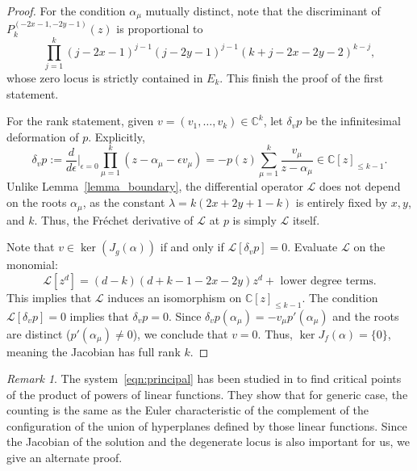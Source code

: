 \documentclass[11pt]{amsart}
\theoremstyle{remark}
\newtheorem{remark}[theorem]{Remark}
\numberwithin{equation}{section}
\begin{document}
\begin{proof}
For the condition $\alpha_\mu$ mutually distinct, note that the discriminant of $P_k^{(-2x-1, -2y-1)}(z)$ is proportional to
\[
    \prod_{j=1}^k (j-2x-1)^{j-1} (j-2y-1)^{j-1} (k+j-2x-2y-2)^{k-j},
\]
whose zero locus is strictly contained in $E_k$. This finish the proof of the first statement.

For the rank statement, given $v = (v_1,\dots,v_k) \in \mathbb{C}^k$, let $\delta_v p$ be the infinitesimal deformation of $p$. Explicitly,
\[
    \delta_v p := \frac{d}{d\epsilon} \Big|_{\epsilon =0} \prod_{\mu=1}^k (z-\alpha_\mu - \epsilon v_\mu) = - p(z) \sum_{\mu=1}^k \frac{v_\mu}{z-\alpha_\mu} \in \mathbb{C}[z]_{\leq k-1}.
\]
Unlike Lemma~\ref{lemma_boundary}, the differential operator $\mathcal{L}$ does not depend on the roots $\alpha_\mu$, as the constant $\lambda = k(2x+2y+1-k)$ is entirely fixed by $x,y$, and $k$. Thus, the Fr\'echet derivative of $\mathcal{L}$ at $p$ is simply $\mathcal{L}$ itself. 

Note that $v \in \ker (J_g(\alpha))$ if and only if $\mathcal{L}[\delta_vp]=0$. Evaluate $\mathcal{L}$ on the monomial:
\[
    \mathcal{L}[z^d] = (d-k)(d+k-1-2x-2y) z^d + \text{ lower degree terms}.
\]
This implies that $\mathcal{L}$ induces an isomorphism on $\mathbb{C}[z]_{\leq k-1}$. The condition $\mathcal{L}[\delta_v p] = 0$ implies that $\delta_v p = 0$. Since $\delta_v p(\alpha_\mu) = -v_\mu p'(\alpha_\mu)$ and the roots are distinct ($p'(\alpha_\mu) \neq 0$), we conclude that $v = 0$. Thus, $\ker J_f(\alpha) = \{0\}$, meaning the Jacobian has full rank $k$.
\end{proof}

\begin{remark} \label{Rmk:Heine_Stieltjes}
The system~\ref{eqn:principal} has been studied in \cite{Varchenko} to find critical points of the product of powers of linear functions. They show that for generic case, the counting is the same as the Euler characteristic of the complement of the configuration of the union of hyperplanes defined by those linear functions. Since the Jacobian of the solution and the degenerate locus is also important for us, we give an alternate proof.
\end{remark}
\end{document}
